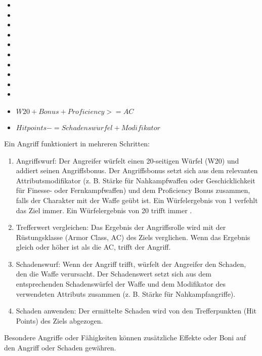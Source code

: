 \begin{itemize}
\item {}
\item {}
\item {}
\item {}
\item {}
\item {}
\item {}
\item {}
\item {}
\item {}
\end{itemize}



\begin{itemize}
\item $W20 + Bonus + Proficiency >= AC$

\item $Hitpoints -= Schadensw\ddot{u}rfel + Modifikator$
\end{itemize}

Ein Angriff funktioniert in mehreren Schritten:

\begin{enumerate}

\item Angriffswurf: Der Angreifer würfelt einen 20-seitigen Würfel (W20) und addiert seinen Angriffsbonus. Der Angriffsbonus setzt sich aus dem relevanten Attributsmodifikator (z. B. Stärke für Nahkampfwaffen oder Geschicklichkeit für Finesse- oder Fernkampfwaffen) und dem Proficiency Bonus zusammen, falls der Charakter mit der Waffe geübt ist. Ein Würfelergebnis von 1 verfehlt das Ziel immer. Ein Würfelergebnis von 20 trifft immer .
\item Trefferwert vergleichen: Das Ergebnis der Angriffsrolle wird mit der Rüstungsklasse (Armor Class, AC) des Ziels verglichen. Wenn das Ergebnis gleich oder höher ist als die AC, trifft der Angriff.
\item Schadenswurf: Wenn der Angriff trifft, würfelt der Angreifer den Schaden, den die Waffe verursacht. Der Schadenswert setzt sich aus dem entsprechenden Schadenswürfel der Waffe und dem Modifikator des verwendeten Attributs zusammen (z. B. Stärke für Nahkampfangriffe).
\item Schaden anwenden: Der ermittelte Schaden wird von den Trefferpunkten (Hit Points) des Ziels abgezogen.
\end{enumerate}
Besondere Angriffe oder Fähigkeiten können zusätzliche Effekte oder Boni auf den Angriff oder Schaden gewähren.



